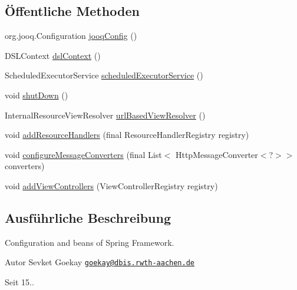 \subsection*{Öffentliche Methoden}
\begin{DoxyCompactItemize}
\item 
org.\-jooq.\-Configuration \hyperlink{classde_1_1rwth_1_1idsg_1_1steve_1_1config_1_1_bean_configuration_af8c6e00b0a3eaca1b3243a3671c57d86}{jooq\-Config} ()
\item 
D\-S\-L\-Context \hyperlink{classde_1_1rwth_1_1idsg_1_1steve_1_1config_1_1_bean_configuration_ac19a217816d7267f0e5655a680f591c0}{dsl\-Context} ()
\item 
Scheduled\-Executor\-Service \hyperlink{classde_1_1rwth_1_1idsg_1_1steve_1_1config_1_1_bean_configuration_ad83cfa068130f9897a79c4f837bbc392}{scheduled\-Executor\-Service} ()
\item 
void \hyperlink{classde_1_1rwth_1_1idsg_1_1steve_1_1config_1_1_bean_configuration_a515e3539c5ac8462c2189b3443c4bcfc}{shut\-Down} ()
\item 
Internal\-Resource\-View\-Resolver \hyperlink{classde_1_1rwth_1_1idsg_1_1steve_1_1config_1_1_bean_configuration_a202a0b2a65be0b82f4710dc89ae87ba0}{url\-Based\-View\-Resolver} ()
\item 
void \hyperlink{classde_1_1rwth_1_1idsg_1_1steve_1_1config_1_1_bean_configuration_aeb98d607f6be74df675aaaf0c23d1ddf}{add\-Resource\-Handlers} (final Resource\-Handler\-Registry registry)
\item 
void \hyperlink{classde_1_1rwth_1_1idsg_1_1steve_1_1config_1_1_bean_configuration_a4909e2ea2b160fbb8033b6f3609abf93}{configure\-Message\-Converters} (final List$<$ Http\-Message\-Converter$<$?$>$$>$ converters)
\item 
void \hyperlink{classde_1_1rwth_1_1idsg_1_1steve_1_1config_1_1_bean_configuration_ae182e8c9016e8132bfd20d6326b3f42d}{add\-View\-Controllers} (View\-Controller\-Registry registry)
\end{DoxyCompactItemize}


\subsection{Ausführliche Beschreibung}
Configuration and beans of Spring Framework.

\begin{DoxyAuthor}{Autor}
Sevket Goekay \href{mailto:goekay@dbis.rwth-aachen.de}{\tt goekay@dbis.\-rwth-\/aachen.\-de} 
\end{DoxyAuthor}
\begin{DoxySince}{Seit}
15.. 
\end{DoxySince}


